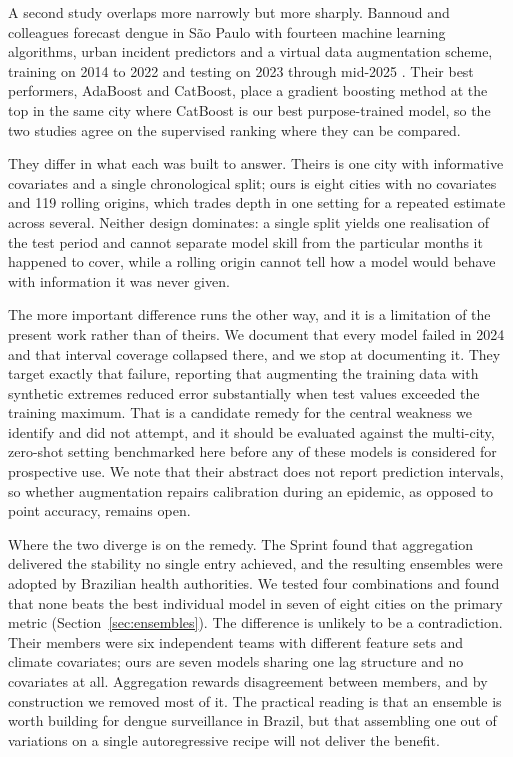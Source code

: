 \documentclass[11pt]{article}
\begin{document}
A second study overlaps more narrowly but more sharply. Bannoud and colleagues forecast
dengue in S\~ao Paulo with fourteen machine learning algorithms, urban incident predictors
and a virtual data augmentation scheme, training on 2014 to 2022 and testing on 2023
through mid-2025 \citep{Bannoud2026augment}. Their best performers, AdaBoost and CatBoost,
place a gradient boosting method at the top in the same city where CatBoost is our best
purpose-trained model, so the two studies agree on the supervised ranking where they can
be compared.

They differ in what each was built to answer. Theirs is one city with informative
covariates and a single chronological split; ours is eight cities with no covariates and
119 rolling origins, which trades depth in one setting for a repeated estimate across
several. Neither design dominates: a single split yields one realisation of the test
period and cannot separate model skill from the particular months it happened to cover,
while a rolling origin cannot tell how a model would behave with information it was never
given.

The more important difference runs the other way, and it is a limitation of the present
work rather than of theirs. We document that every model failed in 2024 and that interval
coverage collapsed there, and we stop at documenting it. They target exactly that failure,
reporting that augmenting the training data with synthetic extremes reduced error
substantially when test values exceeded the training maximum. That is a candidate remedy
for the central weakness we identify and did not attempt, and it should be evaluated
against the multi-city, zero-shot setting benchmarked here before any of these models is
considered for prospective use. We note that their abstract does not report prediction
intervals, so whether augmentation repairs calibration during an epidemic, as opposed to
point accuracy, remains open.

Where the two diverge is on the remedy. The Sprint found that aggregation delivered the
stability no single entry achieved, and the resulting ensembles were adopted by Brazilian
health authorities. We tested four combinations and found that none beats the best
individual model in seven of eight cities on the primary metric
(Section~\ref{sec:ensembles}). The difference is unlikely to be a contradiction. Their
members were six independent teams with different feature sets and climate covariates;
ours are seven models sharing one lag structure and no covariates at all. Aggregation
rewards disagreement between members, and by construction we removed most of it. The
practical reading is that an ensemble is worth building for dengue surveillance in Brazil,
but that assembling one out of variations on a single autoregressive recipe will not
deliver the benefit.
\end{document}
